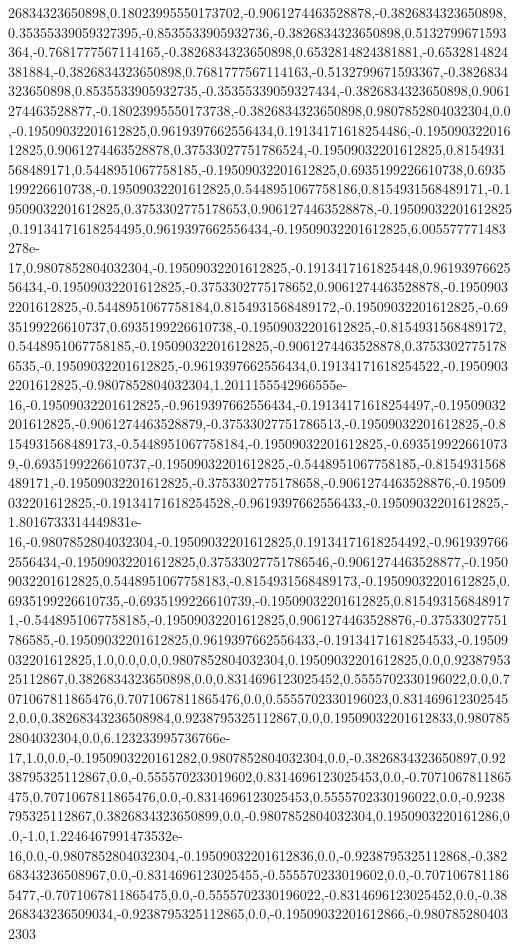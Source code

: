 26834323650898,0.18023995550173702,-0.9061274463528878,-0.3826834323650898,0.35355339059327395,-0.8535533905932736,-0.3826834323650898,0.5132799671593364,-0.7681777567114165,-0.3826834323650898,0.6532814824381881,-0.6532814824381884,-0.3826834323650898,0.7681777567114163,-0.5132799671593367,-0.3826834323650898,0.8535533905932735,-0.35355339059327434,-0.3826834323650898,0.9061274463528877,-0.18023995550173738,-0.3826834323650898,0.9807852804032304,0.0,-0.19509032201612825,0.9619397662556434,0.19134171618254486,-0.19509032201612825,0.9061274463528878,0.37533027751786524,-0.19509032201612825,0.8154931568489171,0.5448951067758185,-0.19509032201612825,0.6935199226610738,0.6935199226610738,-0.19509032201612825,0.5448951067758186,0.8154931568489171,-0.19509032201612825,0.3753302775178653,0.9061274463528878,-0.19509032201612825,0.19134171618254495,0.9619397662556434,-0.19509032201612825,6.005577771483278e-17,0.9807852804032304,-0.19509032201612825,-0.1913417161825448,0.9619397662556434,-0.19509032201612825,-0.3753302775178652,0.9061274463528878,-0.19509032201612825,-0.5448951067758184,0.8154931568489172,-0.19509032201612825,-0.6935199226610737,0.6935199226610738,-0.19509032201612825,-0.8154931568489172,0.5448951067758185,-0.19509032201612825,-0.9061274463528878,0.37533027751786535,-0.19509032201612825,-0.9619397662556434,0.19134171618254522,-0.19509032201612825,-0.9807852804032304,1.2011155542966555e-16,-0.19509032201612825,-0.9619397662556434,-0.19134171618254497,-0.19509032201612825,-0.9061274463528879,-0.37533027751786513,-0.19509032201612825,-0.8154931568489173,-0.5448951067758184,-0.19509032201612825,-0.6935199226610739,-0.6935199226610737,-0.19509032201612825,-0.5448951067758185,-0.8154931568489171,-0.19509032201612825,-0.3753302775178658,-0.9061274463528876,-0.19509032201612825,-0.19134171618254528,-0.9619397662556433,-0.19509032201612825,-1.8016733314449831e-16,-0.9807852804032304,-0.19509032201612825,0.19134171618254492,-0.9619397662556434,-0.19509032201612825,0.37533027751786546,-0.9061274463528877,-0.19509032201612825,0.5448951067758183,-0.8154931568489173,-0.19509032201612825,0.6935199226610735,-0.6935199226610739,-0.19509032201612825,0.8154931568489171,-0.5448951067758185,-0.19509032201612825,0.9061274463528876,-0.37533027751786585,-0.19509032201612825,0.9619397662556433,-0.19134171618254533,-0.19509032201612825,1.0,0.0,0.0,0.9807852804032304,0.19509032201612825,0.0,0.9238795325112867,0.3826834323650898,0.0,0.8314696123025452,0.5555702330196022,0.0,0.7071067811865476,0.7071067811865476,0.0,0.5555702330196023,0.8314696123025452,0.0,0.38268343236508984,0.9238795325112867,0.0,0.19509032201612833,0.9807852804032304,0.0,6.123233995736766e-17,1.0,0.0,-0.1950903220161282,0.9807852804032304,0.0,-0.3826834323650897,0.9238795325112867,0.0,-0.555570233019602,0.8314696123025453,0.0,-0.7071067811865475,0.7071067811865476,0.0,-0.8314696123025453,0.5555702330196022,0.0,-0.9238795325112867,0.3826834323650899,0.0,-0.9807852804032304,0.1950903220161286,0.0,-1.0,1.2246467991473532e-16,0.0,-0.9807852804032304,-0.19509032201612836,0.0,-0.9238795325112868,-0.38268343236508967,0.0,-0.8314696123025455,-0.555570233019602,0.0,-0.7071067811865477,-0.7071067811865475,0.0,-0.5555702330196022,-0.8314696123025452,0.0,-0.38268343236509034,-0.9238795325112865,0.0,-0.19509032201612866,-0.9807852804032303